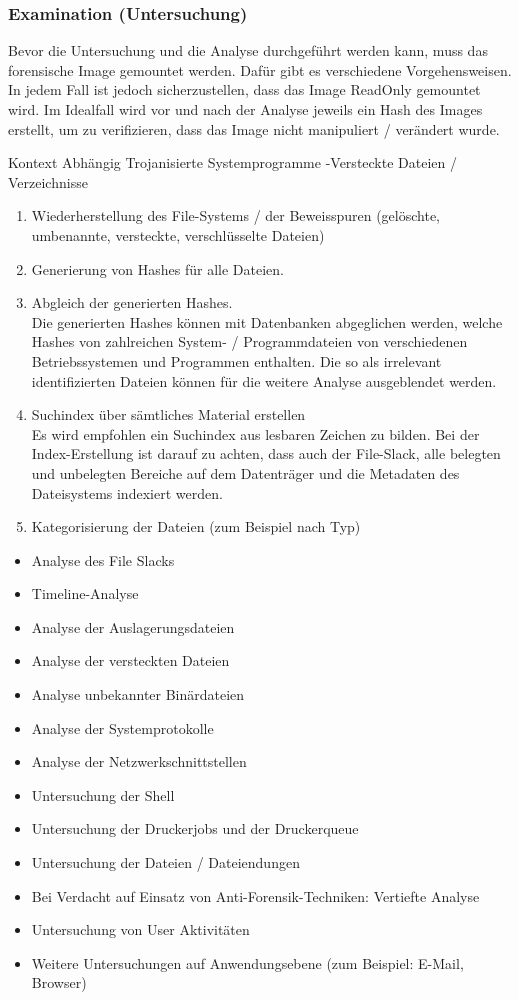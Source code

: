 \subsubsection{Examination (Untersuchung)}
Bevor die Untersuchung und die Analyse durchgeführt werden kann, muss das forensische Image gemountet werden. Dafür gibt es verschiedene Vorgehensweisen. In jedem Fall ist jedoch sicherzustellen, dass das Image ReadOnly gemountet wird. Im Idealfall wird vor und nach der Analyse jeweils ein Hash des Images erstellt, um zu verifizieren, dass das Image nicht manipuliert / verändert wurde.

Kontext Abhängig
Trojanisierte Systemprogramme
-Versteckte Dateien / Verzeichnisse

\begin{enumerate}
\item Wiederherstellung des File-Systems / der Beweisspuren (gelöschte, umbenannte, versteckte, verschlüsselte Dateien)
\item Generierung von Hashes für alle Dateien.
\item Abgleich der generierten Hashes. \\
Die generierten Hashes können mit Datenbanken abgeglichen werden, welche Hashes von zahlreichen System- / Programmdateien von verschiedenen Betriebssystemen und Programmen enthalten. Die so als irrelevant identifizierten Dateien können für die weitere Analyse ausgeblendet werden.
\item Suchindex über sämtliches Material erstellen \\
Es wird empfohlen ein Suchindex aus lesbaren Zeichen zu bilden. Bei der Index-Erstellung ist darauf zu achten, dass auch der File-Slack, alle belegten und unbelegten Bereiche auf dem Datenträger und die Metadaten des Dateisystems indexiert werden.
\item Kategorisierung der Dateien (zum Beispiel nach Typ)

\end{enumerate}

\begin{itemize}
\item Analyse des File Slacks
\item Timeline-Analyse
\item Analyse der Auslagerungsdateien
\item Analyse der versteckten Dateien
\item Analyse unbekannter Binärdateien
\item Analyse der Systemprotokolle
\item Analyse der Netzwerkschnittstellen
\item Untersuchung der Shell
\item Untersuchung der Druckerjobs und der Druckerqueue
\item Untersuchung der Dateien / Dateiendungen
\item Bei Verdacht auf Einsatz von Anti-Forensik-Techniken: Vertiefte Analyse
\item Untersuchung von User Aktivitäten
\item Weitere Untersuchungen auf Anwendungsebene (zum Beispiel: E-Mail, Browser)
\end{itemize}

